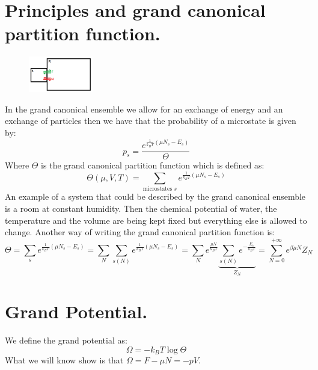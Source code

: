 \documentclass[10pt,a4paper]{book}
\begin{document}
\section{Principles and grand canonical partition function.}
\begin{figure}
    \includegraphics[width=0.25\textwidth]{graphs/GrandCan}
\end{figure}
In the grand canonical ensemble we allow for an exchange of energy and an exchange of particles then we have that the probability of a microstate is given by:
\[
p_s = \frac{e^{\frac{1}{k_B T}(\mu N_s - E_s)}}{\Theta}
\]
Where $\Theta$ is the grand canonical partition function which is defined as:
\[
\Theta(\mu, V, T) = \sum_{\text{microstates } s} e^{\frac{1}{k_B T}(\mu N_s - E_s)}
\]
An example of a system that could be described by the grand canonical ensemble is a room at constant humidity.  Then the chemical potential of water, the temperature and the volume are being kept fixed but everything else is allowed to change. Another way of writing the grand canonical partition function is:
\[
\Theta = \sum_s e^{\frac{1}{k_B T}(\mu N_s - E_s)} = \sum_N \sum_{s(N)} e^{\frac{1}{k_B T}(\mu N_s - E_s)} = \sum_N e^\frac{\mu N}{k_B T} \underbrace{\sum_{s(N)} e^{- \frac{E_s}{k_B T}}}_{Z_N} = \sum_{N = 0}^{+\infty} e^{\beta \mu N} Z_N
\]

\section{Grand Potential.}
We define the grand potential as:
\[
\Omega = -k_B T \log \Theta
\]
What we will know show is that $\Omega = F - \mu N = - p V$.
\end{document}
